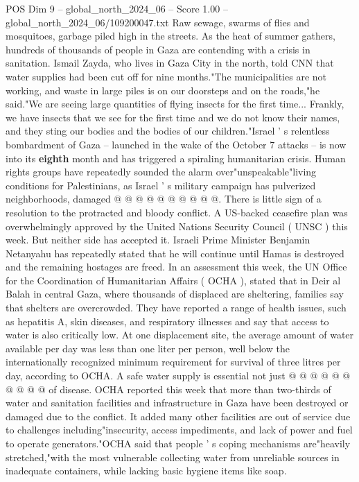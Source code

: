 \begin{textsample}{POS Dim 9 – global\_north\_2024\_06 – Score 1.00 – global\_north\_2024\_06/109200047.txt}  \label{ex:f9_pos_290}
Raw sewage, swarms of flies and mosquitoes, garbage piled high in the streets.
As the heat of summer gathers, hundreds of thousands of people in Gaza are contending with a crisis in sanitation.
Ismail Zayda, who lives in Gaza City in the north, told CNN that water supplies had been cut off for nine months."The municipalities are not working, and waste in large piles is on our doorsteps and on the roads,"he said."We are seeing large quantities of flying insects for the first time...
Frankly, we have insects that we see for the first time and we do not know their names, and they sting our bodies and the bodies of our children."Israel ' s relentless bombardment of Gaza -- launched in the wake of the October 7 attacks -- is now into its \textbf{eighth} month and has triggered a spiraling humanitarian crisis.
Human rights groups have repeatedly sounded the alarm over"unspeakable"living conditions for Palestinians, as Israel ' s military campaign has pulverized neighborhoods, damaged @ @ @ @ @ @ @ @ @ @.
There is little sign of a resolution to the protracted and bloody conflict.
A US-backed ceasefire plan was overwhelmingly approved by the United Nations Security Council ( UNSC ) this week.
But neither side has accepted it.
Israeli Prime Minister Benjamin Netanyahu has repeatedly stated that he will continue until Hamas is destroyed and the remaining hostages are freed.
In an assessment this week, the UN Office for the Coordination of Humanitarian Affairs ( OCHA ), stated that in Deir al Balah in central Gaza, where thousands of displaced are sheltering, families say that shelters are overcrowded.
They have reported a range of health issues, such as hepatitis A, skin diseases, and respiratory illnesses and say that access to water is also critically low.
At one displacement site, the average amount of water available per day was less than one liter per person, well below the internationally recognized minimum requirement for survival of three litres per day, according to OCHA.
A safe water supply is essential not just @ @ @ @ @ @ @ @ @ @ of disease.
OCHA reported this week that more than two-thirds of water and sanitation facilities and infrastructure in Gaza have been destroyed or damaged due to the conflict.
It added many other facilities are out of service due to challenges including"insecurity, access impediments, and lack of power and fuel to operate generators."OCHA said that people ' s coping mechanisms are"heavily stretched,"with the most vulnerable collecting water from unreliable sources in inadequate containers, while lacking basic hygiene items like soap.

\end{textsample}
